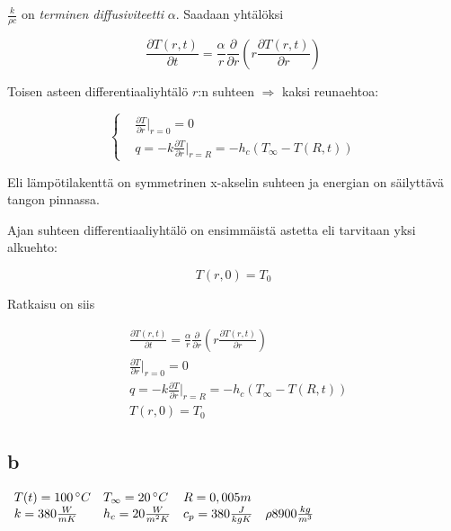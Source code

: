 \documentclass[12pt,a4paper,finnish]{article}
\begin{document}
$\frac{k}{\rho c}$ on \textit{terminen diffusiviteetti} $\alpha$. Saadaan yhtälöksi

\begin{equation}
 \frac{\partial T(r, t)}{\partial t} = \frac{\alpha}{r}\frac{\partial}{\partial r}
 \left(r\frac{\partial T(r, t)}{\partial r}\right)
\end{equation}

Toisen asteen differentiaaliyhtälö $r$:n suhteen $\Rightarrow$ kaksi reunaehtoa:

\begin{equation}
 \left\{
 \begin{aligned}
  &\frac{\partial T}{\partial r}\bigg|_{r = 0} = 0\\
  &q = -k\frac{\partial T}{\partial r}\bigg|_{r = R} = -h_c(T_{\infty} - T(R, t))
 \end{aligned}\right.
\end{equation}

Eli lämpötilakenttä on symmetrinen x-akselin suhteen ja energian on säilyttävä tangon pinnassa.

Ajan suhteen differentiaaliyhtälö on ensimmäistä astetta eli tarvitaan yksi alkuehto:

\begin{equation}
 T(r, 0) = T_0
\end{equation}

Ratkaisu on siis

\begin{framed}
 \begin{align}
  &\frac{\partial T(r, t)}{\partial t} = \frac{\alpha}{r}\frac{\partial}{\partial r}
    \left(r\frac{\partial T(r, t)}{\partial r}\right)\\
  &\frac{\partial T}{\partial r}\bigg|_{r = 0} = 0\\
  &q = -k\frac{\partial T}{\partial r}\bigg|_{r = R} = -h_c(T_{\infty} - T(R, t))\\
  &T(r, 0) = T_0
 \end{align}
\end{framed}

\subsection{b}

\begin{math}
 \begin{array}{l l l l}
  T(t) = 100\,^{\circ}C & T_{\infty} = 20\,^{\circ}C & R = 0,005 m & \\
  k = 380 \frac{W}{mK} & h_c = 20 \frac{W}{m^2K} & c_p = 380 \frac{J}{kgK} & \rho 8900 \frac{kg}{m^3}
 \end{array}
\end{math}
\end{document}
